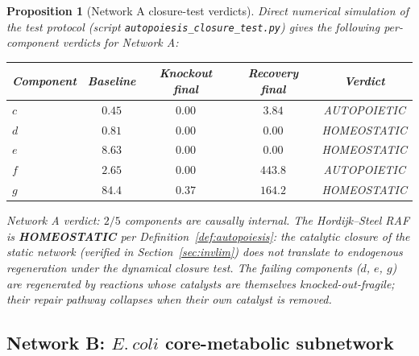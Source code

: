 \documentclass[11pt,a4paper]{article}
\theoremstyle{plain}
\newtheorem{proposition}[theorem]{Proposition}
\theoremstyle{definition}
\theoremstyle{remark}
\begin{document}
\begin{proposition}[Network A closure-test verdicts]
\label{prop:netA-verdict}
Direct numerical simulation of the test protocol
(script \texttt{autopoiesis\_closure\_test.py}) gives the following
per-component verdicts for Network A:
\begin{center}\small
\begin{tabular}{lcccc}
\toprule
Component & Baseline & Knockout final & Recovery final & Verdict \\
\midrule
$c$ & $0.45$ & $0.00$ & $3.84$ & AUTOPOIETIC \\
$d$ & $0.81$ & $0.00$ & $0.00$ & HOMEOSTATIC \\
$e$ & $8.63$ & $0.00$ & $0.00$ & HOMEOSTATIC \\
$f$ & $2.65$ & $0.00$ & $443.8$ & AUTOPOIETIC \\
$g$ & $84.4$ & $0.37$ & $164.2$ & HOMEOSTATIC \\
\bottomrule
\end{tabular}
\end{center}
Network A verdict: $2/5$ components are causally internal. The
Hordijk--Steel RAF is \textbf{HOMEOSTATIC} per
Definition~\ref{def:autopoiesis}: the catalytic closure of the static
network (verified in Section~\ref{sec:invlim}) does not translate to
endogenous regeneration under the dynamical closure test. The
failing components ($d$, $e$, $g$) are regenerated by reactions whose
catalysts are themselves knocked-out-fragile; their repair pathway
collapses when their own catalyst is removed.
\end{proposition}

\subsection{Network B: $E.~coli$ core-metabolic subnetwork}
\end{document}
